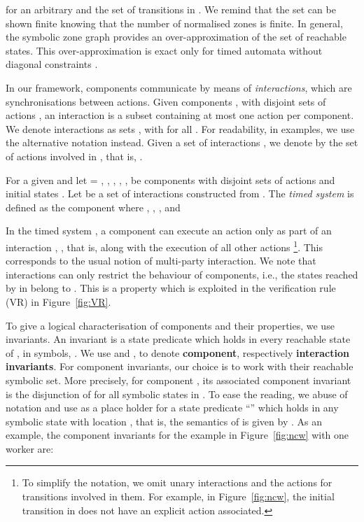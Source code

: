 \documentclass{LMCS}
\theoremstyle{plain}\newtheorem{remark}[thm]{Remark}
\theoremstyle{plain}\newtheorem{example}[thm]{Example}
\begin{document}
for an arbitrary  and  the set of transitions in .  We remind
that the set  can be shown finite knowing that the number
of normalised zones is finite.  In general, the symbolic zone graph
provides an over-approximation of the set of reachable states.  This
over-approximation is exact only for timed automata without diagonal
constraints \cite{bengtssonY03, bouyer04}.

In our framework, components communicate by means of
\emph{interactions}, which are synchronisations between actions.
Given  components , with disjoint sets of actions
, an interaction is a subset 
containing at most one action per component.  We denote interactions
 as sets , with  for all . For readability, in examples, we
use the alternative notation 
instead. Given a set of interactions , we denote by
 the set of actions involved in , that is,
.

\begin{defi} 
For a given  and  let  = ,
, , , ,  be  components with
disjoint sets of actions and initial states .  Let  be a set of interactions constructed from
.  The \emph{timed system}  is defined as
the component  where , , ,
 and
  
\end{defi}

In the timed system , a component  can execute
an action  only as part of an interaction , , that is, along with the execution of all other actions \footnote{To simplify the notation, we omit unary interactions and the
  actions for transitions involved in them. For example, in
  Figure~\ref{fig:ncw}, the initial transition in  does not have
  an explicit action associated.}. This corresponds to the usual notion of multi-party
interaction. We note that interactions can only restrict the behaviour
of components, i.e., the states reached by  in  belong to . This is a property which is
exploited in the verification rule (VR) in Figure~\ref{fig:VR}. 

To give a logical characterisation of components and their properties, we
use invariants. An invariant  is a state predicate which holds in
every reachable state of , in symbols, .  We use
 and , to denote \textbf{component}, respectively
\textbf{interaction invariants}.  For component invariants, our choice is
to work with their reachable symbolic set. More precisely, for component
, its associated component invariant  is the disjunction
of  for all symbolic states  in
.  To ease the reading, we abuse of notation and use
 as a place holder for a state predicate ``'' which
holds in any symbolic state with location , that is, the semantics of
 is given by .  As an
example, the component invariants for the example in Figure~\ref{fig:ncw}
with one worker are:
\end{document}
